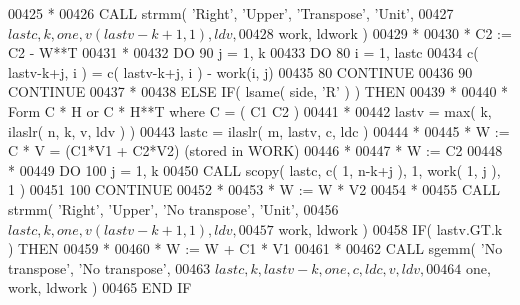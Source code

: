 \begin{DoxyCode}
00425 \textcolor{comment}{*}
00426                \textcolor{keyword}{CALL }strmm( \textcolor{stringliteral}{'Right'}, \textcolor{stringliteral}{'Upper'}, \textcolor{stringliteral}{'Transpose'}, \textcolor{stringliteral}{'Unit'},
00427      $              lastc, k, one, v( lastv-k+1, 1 ), ldv,
00428      $              work, ldwork )
00429 \textcolor{comment}{*}
00430 \textcolor{comment}{*              C2 := C2 - W**T}
00431 \textcolor{comment}{*}
00432                \textcolor{keywordflow}{DO} 90 j = 1, k
00433                   \textcolor{keywordflow}{DO} 80 i = 1, lastc
00434                      c( lastv-k+j, i ) = c( lastv-k+j, i ) - work(i, j)
00435    80             \textcolor{keywordflow}{CONTINUE}
00436    90          \textcolor{keywordflow}{CONTINUE}
00437 \textcolor{comment}{*}
00438             \textcolor{keywordflow}{ELSE} \textcolor{keywordflow}{IF}( lsame( side, \textcolor{stringliteral}{'R'} ) ) \textcolor{keywordflow}{THEN}
00439 \textcolor{comment}{*}
00440 \textcolor{comment}{*              Form  C * H  or  C * H**T  where  C = ( C1  C2 )}
00441 \textcolor{comment}{*}
00442                lastv = max( k, ilaslr( n, k, v, ldv ) )
00443                lastc = ilaslr( m, lastv, c, ldc )
00444 \textcolor{comment}{*}
00445 \textcolor{comment}{*              W := C * V  =  (C1*V1 + C2*V2)  (stored in WORK)}
00446 \textcolor{comment}{*}
00447 \textcolor{comment}{*              W := C2}
00448 \textcolor{comment}{*}
00449                \textcolor{keywordflow}{DO} 100 j = 1, k
00450                   \textcolor{keyword}{CALL }scopy( lastc, c( 1, n-k+j ), 1, work( 1, j ), 1 )
00451   100          \textcolor{keywordflow}{CONTINUE}
00452 \textcolor{comment}{*}
00453 \textcolor{comment}{*              W := W * V2}
00454 \textcolor{comment}{*}
00455                \textcolor{keyword}{CALL }strmm( \textcolor{stringliteral}{'Right'}, \textcolor{stringliteral}{'Upper'}, \textcolor{stringliteral}{'No transpose'}, \textcolor{stringliteral}{'Unit'},
00456      $              lastc, k, one, v( lastv-k+1, 1 ), ldv,
00457      $              work, ldwork )
00458                \textcolor{keywordflow}{IF}( lastv.GT.k ) \textcolor{keywordflow}{THEN}
00459 \textcolor{comment}{*}
00460 \textcolor{comment}{*                 W := W + C1 * V1}
00461 \textcolor{comment}{*}
00462                   \textcolor{keyword}{CALL }sgemm( \textcolor{stringliteral}{'No transpose'}, \textcolor{stringliteral}{'No transpose'},
00463      $                 lastc, k, lastv-k, one, c, ldc, v, ldv,
00464      $                 one, work, ldwork )
00465 \textcolor{keywordflow}{               END IF}

\end{DoxyCode}
